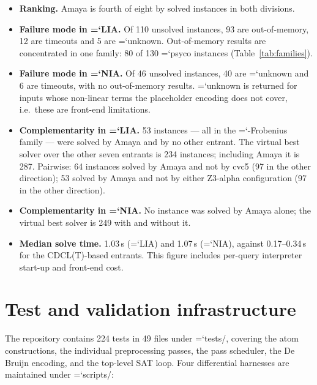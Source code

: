 \documentclass[10pt,a4paper]{article}
\newcommand{\amaya}{Amaya}
\newcommand{\code}[1]{{\small\ttfamily\hyphenchar\font=`\-\relax #1}}
\begin{document}
\begin{itemize}
  \item \textbf{Ranking.}  \amaya{} is fourth of eight by solved instances in both divisions.
  \item \textbf{Failure mode in \code{LIA}.}  Of 110 unsolved instances, 93 are out-of-memory, 12 are
        timeouts and 5 are \code{unknown}.  Out-of-memory results are concentrated in one family:
        80 of 130 \code{psyco} instances (Table~\ref{tab:families}).
  \item \textbf{Failure mode in \code{NIA}.}  Of 46 unsolved instances, 40 are \code{unknown} and 6 are
        timeouts, with no out-of-memory results.  \code{unknown} is returned for inputs whose
        non-linear terms the placeholder encoding does not cover, i.e.\ these are front-end
        limitations.
  \item \textbf{Complementarity in \code{LIA}.}  53 instances --- all in the
        \code{20250213-Frobenius} family --- were solved by \amaya{} and by no other entrant.  The
        virtual best solver over the other seven entrants is 234 instances; including \amaya{} it is
        287.  Pairwise: 64 instances solved by \amaya{} and not by cvc5 (97 in the other direction);
        53 solved by \amaya{} and not by either Z3-alpha configuration (97 in the other direction).
  \item \textbf{Complementarity in \code{NIA}.}  No instance was solved by \amaya{} alone; the virtual
        best solver is 249 with and without it.
  \item \textbf{Median solve time.}  1.03\,s (\code{LIA}) and 1.07\,s (\code{NIA}), against
        0.17--0.34\,s for the CDCL(T)-based entrants.  This figure includes per-query interpreter
        start-up and front-end cost.
\end{itemize}

\section{Test and validation infrastructure}
\label{sec:tests}

The repository contains 224 tests in 49 files under \code{tests/}, covering the atom constructions,
the individual preprocessing passes, the pass scheduler, the De Bruijn encoding, and the top-level SAT
loop.  Four differential harnesses are maintained under \code{scripts/}:
\end{document}

